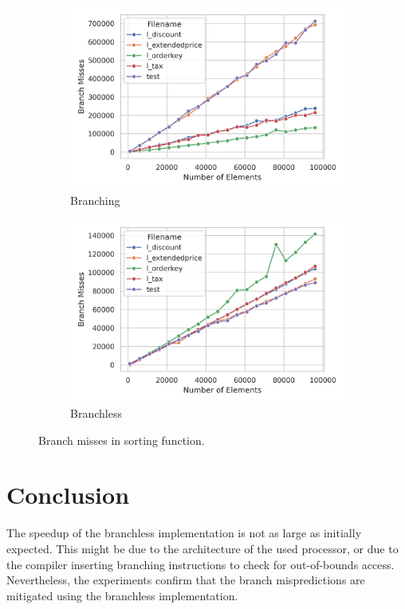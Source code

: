 \documentclass[a4paper,10pt]{article}
\begin{document}
\begin{figure}[htbp]
    \centering
    \begin{subfigure}[b]{0.40\textwidth}
        \centering
        \includegraphics[width=\textwidth]{../graphs/branching_misses.png}
        \caption{Branching}
        \label{fig:misses_branching}
    \end{subfigure}
    \begin{subfigure}[b]{0.40\textwidth}
        \centering
        \includegraphics[width=\textwidth]{../graphs/condition-assign_misses.png}
        \caption{Branchless}
        \label{fig:misses_branchless}
    \end{subfigure}
    \caption{Branch misses in sorting function.}
    \label{fig:elapsed_time}
\end{figure}

\section{Conclusion}

The speedup of the branchless implementation is not as large as initially expected. 
This might be due to the architecture of 
the used processor, or due to the compiler inserting branching instructions to check for
out-of-bounds access. Nevertheless, the experiments confirm that the branch mispredictions
are mitigated using the branchless implementation.
\end{document}
